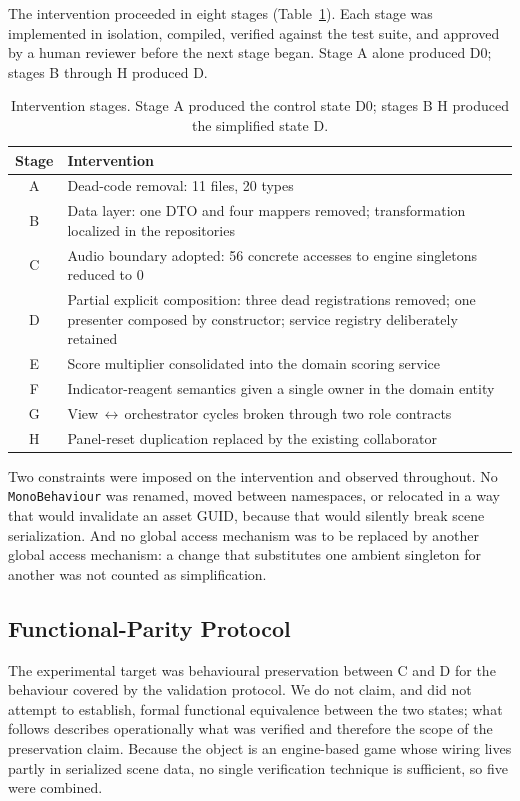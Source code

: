 \documentclass[pdflatex,sn-basic]{sn-jnl}
\begin{document}
The intervention proceeded in eight stages (Table~\ref{tab:stages}). Each stage was implemented in isolation, compiled, verified against the test suite, and approved by a human reviewer before the next stage began. Stage A alone produced D0; stages B through H produced D.

\begin{table}[!htbp]
\centering
\caption{Intervention stages. Stage A produced the control state D0; stages B\textendash{} H produced the simplified state D.}\label{tab:stages}
\small
\begin{tabular}{cp{}}
\toprule
\textbf{Stage} & \textbf{Intervention} \\
\midrule
A & Dead-code removal: 11 files, 20 types \\
B & Data layer: one DTO and four mappers removed; transformation localized in the repositories \\
C & Audio boundary adopted: 56 concrete accesses to engine singletons reduced to 0 \\
D & Partial explicit composition: three dead registrations removed; one presenter composed by constructor; service registry deliberately retained \\
E & Score multiplier consolidated into the domain scoring service \\
F & Indicator-reagent semantics given a single owner in the domain entity \\
G & View\,$\leftrightarrow$\,orchestrator cycles broken through two role contracts \\
H & Panel-reset duplication replaced by the existing collaborator \\
\bottomrule
\end{tabular}
\end{table}

Two constraints were imposed on the intervention and observed throughout. No \texttt{MonoBehaviour} was renamed, moved between namespaces, or relocated in a way that would invalidate an asset GUID, because that would silently break scene serialization. And no global access mechanism was to be replaced by another global access mechanism: a change that substitutes one ambient singleton for another was not counted as simplification.

\subsection{Functional-Parity Protocol}

The experimental target was behavioural preservation between C and D for the behaviour covered by the validation protocol. We do not claim, and did not attempt to establish, formal functional equivalence between the two states; what follows describes operationally what was verified and therefore the scope of the preservation claim. Because the object is an engine-based game whose wiring lives partly in serialized scene data, no single verification technique is sufficient, so five were combined.
\end{document}
